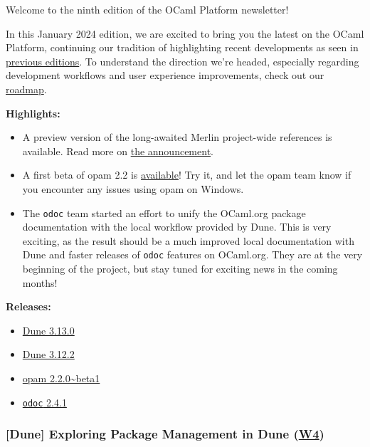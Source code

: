 \documentclass[11pt]{article}
\begin{document}
Welcome to the ninth edition of the OCaml Platform newsletter!

In this January 2024 edition, we are excited to bring you the latest on the OCaml Platform, continuing our tradition of highlighting
recent developments as seen in \href{https://discuss.ocaml.org/tag/platform-newsletter}{previous editions}. To understand the direction
we're headed, especially regarding development workflows and user experience improvements, check out our
\href{https://ocaml.org/docs/platform-roadmap}{roadmap}.

\textbf{Highlights:}
\begin{itemize}
\item A preview version of the long-awaited Merlin project-wide references is available. Read more on \href{https://discuss.ocaml.org/t/ann-preview-play-with-project-wide-occurrences-for-ocaml/13814}{the announcement}.
\item A first beta of opam 2.2 is \href{https://ocaml.org/changelog/2024-01-18-opam-2-2-0-beta1}{available}! Try it, and let the opam team know if you encounter any issues using opam on Windows.
\item The \texttt{odoc} team started an effort to unify the OCaml.org package documentation with the local workflow provided by Dune. This is very exciting, as the result should be a much improved local documentation with Dune and faster releases of \texttt{odoc} features on OCaml.org. They are at the very beginning of the project, but stay tuned for exciting news in the coming months!
\end{itemize}

\textbf{Releases:}
\begin{itemize}
\item \href{https://ocaml.org/changelog/2024-01-16-dune-3.13.0}{Dune 3.13.0}
\item \href{https://ocaml.org/changelog/2024-01-05-dune-3.12.2}{Dune 3.12.2}
\item \href{https://ocaml.org/changelog/2024-01-18-opam-2-2-0-beta1}{opam 2.2.0\textasciitilde{}beta1}
\item \href{https://ocaml.org/changelog/2024-01-24-odoc-2.4.1}{\texttt{odoc} 2.4.1}
\end{itemize}
\subsubsection*{\textbf{{[}Dune]} Exploring Package Management in Dune (\href{https://ocaml.org/docs/platform-roadmap\#w4-build-a-project}{W4})}
\label{sec:org628352d}
\end{document}
